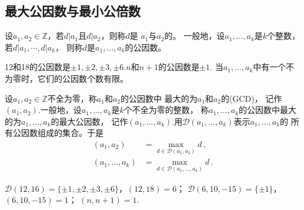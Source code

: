 \subsection*{最大公因数与最小公倍数}
\begin{definition}
    设$a_1,a_2\in\mathbb{Z}$，若$d|a_1$且$d|a_2$，则称$d$是
    $a_1$与$a_2$的。
    一般地，设$a_1,\ldots,a_k$是$k$个整数，若$d|a_1,\cdots,d|a_k$，
    则称$d$是$a_1,\ldots,a_k$的公因数。
\end{definition}
\begin{example}
    12和18的公因数是$\pm1,\pm2,\pm3,\pm6$.$n$和$n+1$的公因数是$\pm1$.
    当$a_1,\ldots,a_k$中有一个不为零时，它们的公因数个数有限。
\end{example}
\begin{definition}
    设$a_1,a_2\in\mathbb{Z}$不全为零，称$a_1$和$a_2$的公因数中
    最大的为$a_1$和$a_2$的(GCD)，
    记作$(a_1,a_2)$.一般地，设$a_1,\ldots,a_k$是$k$个不全为零的整数，
    称$a_1,\ldots,a_k$的公因数中最大的为$a_1,\ldots,a_k$的最大公因数，
    记作$(a_1,\ldots,a_k)$.用$\mathcal{D}(a_1,\ldots,a_k)$表示$a_1,\ldots,a_k$的
    所有公因数组成的集合。于是
    \begin{align}
        (a_1,a_2)        & =\max\limits_{d\in\mathcal{D}(a_1,a_2)}{d}\, ,        \\
        (a_1,\ldots,a_k) & =\max\limits_{d\in\mathcal{D}(a_1,\ldots,a_k)}{d}\, .
    \end{align}
\end{definition}
\begin{example}
    $\mathcal{D}(12,16)=\{\pm1,\pm2,\pm3,\pm6\}$，$(12,18)=6$；
    $\mathcal{D}(6,10,-15)=\{\pm1\}$，$(6,10,-15)=1$；
    $(n,n+1)=1$.
\end{example}

